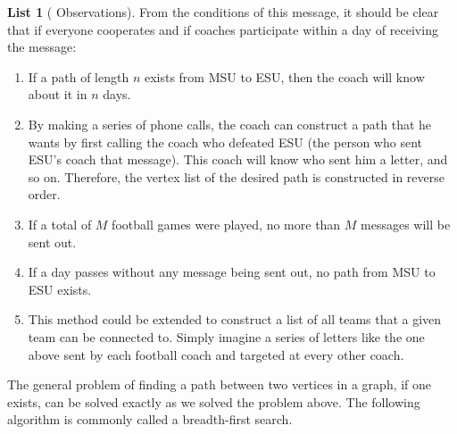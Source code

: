 \documentclass[10pt,]{book}
\theoremstyle{plain}
\theoremstyle{definition}
\theoremstyle{definition}
\theoremstyle{definition}
\theoremstyle{definition}
\theoremstyle{definition}
\newtheorem{listwrapper}[theorem]{List}
\numberwithin{equation}{section}
\begin{document}
\begin{listwrapper}[
Observations]\label{list-6}
\typeout{************************************************}
\typeout{************************************************}
From the conditions of this message, it should be clear that if everyone cooperates and if coaches participate within a day of receiving
the message:%
\leavevmode%
\begin{enumerate}[label=\arabic*]
\item\hypertarget{li-44}{} If a path of length \(n\) exists from MSU to ESU, then the coach will know about it in \(n\) days.%
\item\hypertarget{li-45}{} By making a series of phone calls, the coach can construct a path that he wants by first calling the coach who defeated ESU (the person who sent ESU's coach that message). This coach will know who sent him a letter, and so on. Therefore, the vertex list of the desired path is constructed in reverse order.%
\item\hypertarget{li-46}{} If a total of \(M\) football games were played, no more than \(M\) messages will be sent out.%
\item\hypertarget{li-47}{} If a day passes without any message being sent out, no path from MSU to ESU exists.%
\item\hypertarget{li-48}{} This method could be extended to construct a list of all teams that a given team can be connected to. Simply imagine a series of letters like the one above sent by each football coach and targeted at every other coach.%
\end{enumerate}
\end{listwrapper}
\par
The general problem of finding a path between two vertices in a graph, if one exists, can be solved exactly as we solved the problem above. The following
algorithm is commonly called a  breadth-first search.%
\end{document}
